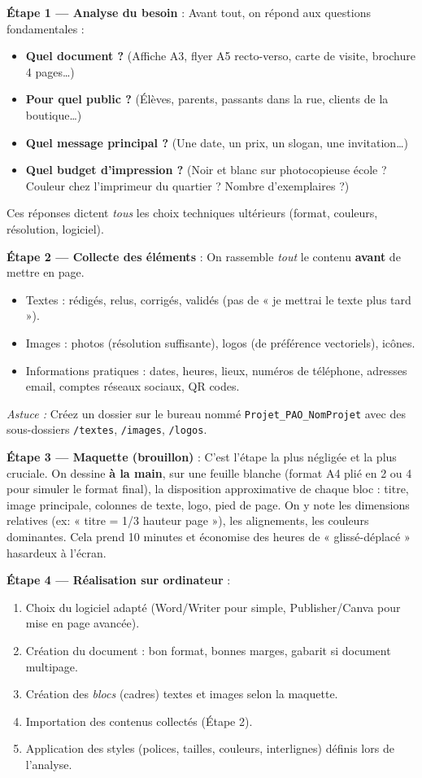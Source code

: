 \documentclass[11pt]{article}
\begin{document}
\begin{methode}
\textbf{Étape 1 — Analyse du besoin} : Avant tout, on répond aux questions fondamentales :
\begin{itemize}
    \item \textbf{Quel document ?} (Affiche A3, flyer A5 recto-verso, carte de visite, brochure 4 pages…)
    \item \textbf{Pour quel public ?} (Élèves, parents, passants dans la rue, clients de la boutique…)
    \item \textbf{Quel message principal ?} (Une date, un prix, un slogan, une invitation…)
    \item \textbf{Quel budget d'impression ?} (Noir et blanc sur photocopieuse école ? Couleur chez l'imprimeur du quartier ? Nombre d'exemplaires ?)
\end{itemize}
Ces réponses dictent \emph{tous} les choix techniques ultérieurs (format, couleurs, résolution, logiciel).

\textbf{Étape 2 — Collecte des éléments} : On rassemble \emph{tout} le contenu \textbf{avant} de mettre en page.
\begin{itemize}
    \item Textes : rédigés, relus, corrigés, validés (pas de « je mettrai le texte plus tard »).
    \item Images : photos (résolution suffisante), logos (de préférence vectoriels), icônes.
    \item Informations pratiques : dates, heures, lieux, numéros de téléphone, adresses email, comptes réseaux sociaux, QR codes.
\end{itemize}
\textit{Astuce :} Créez un dossier sur le bureau nommé \texttt{Projet\_PAO\_NomProjet} avec des sous-dossiers \texttt{/textes}, \texttt{/images}, \texttt{/logos}.

\textbf{Étape 3 — Maquette (brouillon)} : C'est l'étape la plus négligée et la plus cruciale. On dessine \textbf{à la main}, sur une feuille blanche (format A4 plié en 2 ou 4 pour simuler le format final), la disposition approximative de chaque bloc : titre, image principale, colonnes de texte, logo, pied de page. On y note les dimensions relatives (ex: « titre = 1/3 hauteur page »), les alignements, les couleurs dominantes. Cela prend 10 minutes et économise des heures de « glissé-déplacé » hasardeux à l'écran.

\textbf{Étape 4 — Réalisation sur ordinateur} :
\begin{enumerate}
    \item Choix du logiciel adapté (Word/Writer pour simple, Publisher/Canva pour mise en page avancée).
    \item Création du document : bon format, bonnes marges, gabarit si document multipage.
    \item Création des \emph{blocs} (cadres) textes et images selon la maquette.
    \item Importation des contenus collectés (Étape 2).
    \item Application des styles (polices, tailles, couleurs, interlignes) définis lors de l'analyse.
\end{enumerate}


\end{methode}
\end{document}
